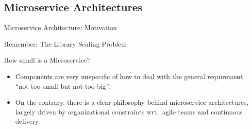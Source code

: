 \subsection{Microservice Architectures}
\begin{frame}{Microservice Architecture: Motivation}
	\begin{mycolumns}[widths={50,50},animation=none]
		\begin{note}{Remember: The Library Scaling Problem}
			\centering
		\end{note}
	\mynextcolumn		
		\pause
		\begin{note}{How small is a Microservice?}
			\begin{itemize}
				\item Components are very unspecific of how to deal with the general requirement ``not too small but not too big''.
				\item On the contrary, there is a clear philosophy behind microservice architectures, largely driven by organizational constraints wrt.\ agile teams and continuous delivery.
			\end{itemize}
		\end{note}
		\pause
		\begin{definition}{}
		\end{definition}
	\end{mycolumns}
\end{frame}


